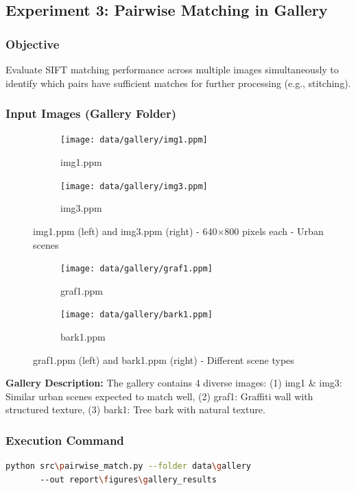 \documentclass[12pt,a4paper]{article}
\begin{document}
\subsection{Experiment 3: Pairwise Matching in Gallery}

\subsubsection{Objective}
Evaluate SIFT matching performance across multiple images simultaneously to identify which pairs have sufficient matches for further processing (e.g., stitching).

\subsubsection{Input Images (Gallery Folder)}

\begin{figure}[H]
\centering
\begin{subfigure}{0.45\textwidth}
\texttt{[image: data/gallery/img1.ppm]}
\caption{img1.ppm}
\end{subfigure}
\hfill
\begin{subfigure}{0.45\textwidth}
\texttt{[image: data/gallery/img3.ppm]}
\caption{img3.ppm}
\end{subfigure}
\caption{img1.ppm (left) and img3.ppm (right) - 640×800 pixels each - Urban scenes}
\end{figure}

\begin{figure}[H]
\centering
\begin{subfigure}{0.45\textwidth}
\texttt{[image: data/gallery/graf1.ppm]}
\caption{graf1.ppm}
\end{subfigure}
\hfill
\begin{subfigure}{0.45\textwidth}
\texttt{[image: data/gallery/bark1.ppm]}
\caption{bark1.ppm}
\end{subfigure}
\caption{graf1.ppm (left) and bark1.ppm (right) - Different scene types}
\end{figure}

\textbf{Gallery Description:}
The gallery contains 4 diverse images: (1) img1 \& img3: Similar urban scenes expected to match well, (2) graf1: Graffiti wall with structured texture, (3) bark1: Tree bark with natural texture.

\subsubsection{Execution Command}
\begin{lstlisting}[language=bash]
python src\pairwise_match.py --folder data\gallery 
       --out report\figures\gallery_results
\end{lstlisting}
\end{document}
